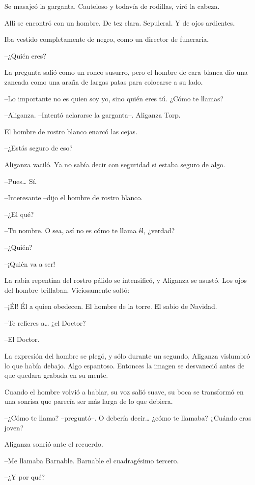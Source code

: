 Se masajeó la garganta. Cauteloso y todavía de rodillas, viró la cabeza.

Allí se encontró con un hombre. De tez clara. Sepulcral. Y de ojos ardientes.

Iba vestido completamente de negro, como un director de funeraria.

--¿Quién eres?

La pregunta salió como un ronco susurro, pero el hombre de cara blanca dio una zancada como una araña de largas patas para colocarse a su lado.

--Lo importante no es quien soy yo, sino quién eres tú. ¿Cómo te llamas?

--Aliganza. --Intentó aclararse la garganta--. Aliganza Torp.

El hombre de rostro blanco enarcó las cejas.

--¿Estás seguro de eso?

Aliganza vaciló. Ya no sabía decir con seguridad si estaba seguro de algo.

--Pues… Sí.

--Interesante --dijo el hombre de rostro blanco.

--¿El qué?

--Tu nombre. O sea, así no es cómo te llama él, ¿verdad?

--¿Quién?

--¡Quién va a ser!

La rabia repentina del rostro pálido se intensificó, y Aliganza se asustó. Los ojos del hombre brillaban. Viciosamente soltó:

--¡Él! Él a quien obedecen. El hombre de la torre. El sabio de Navidad.

--Te refieres a… ¿el Doctor?

--El Doctor.

La expresión del hombre se plegó, y sólo durante un segundo, Aliganza vislumbró lo que había debajo. Algo espantoso. Entonces la imagen se desvaneció antes de que quedara grabada en su mente.

Cuando el hombre volvió a hablar, su voz salió suave, su boca se transformó en una sonrisa que parecía ser más larga de lo que debiera.

--¿Cómo te llama? --preguntó--. O debería decir… ¿cómo te llamaba? ¿Cuándo eras joven?

Aliganza sonrió ante el recuerdo.

--Me llamaba Barnable. Barnable el cuadragésimo tercero.

--¿Y por qué?

